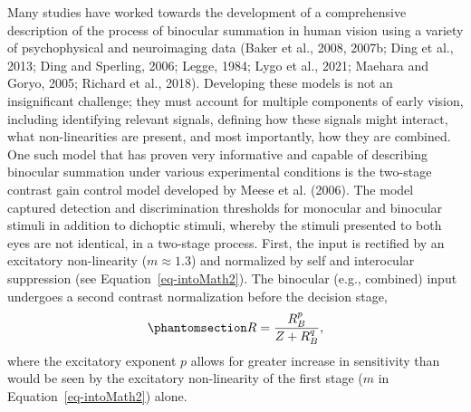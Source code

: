 \documentclass[
  12pt,
]{article}
\begin{document}
Many studies have worked towards the development of a comprehensive
description of the process of binocular summation in human vision using
a variety of psychophysical and neuroimaging data (Baker et al., 2008,
2007b; Ding et al., 2013; Ding and Sperling, 2006; Legge, 1984; Lygo et
al., 2021; Maehara and Goryo, 2005; Richard et al., 2018). Developing
these models is not an insignificant challenge; they must account for
multiple components of early vision, including identifying relevant
signals, defining how these signals might interact, what non-linearities
are present, and most importantly, how they are combined. One such model
that has proven very informative and capable of describing binocular
summation under various experimental conditions is the two-stage
contrast gain control model developed by Meese et al. (2006). The model
captured detection and discrimination thresholds for monocular and
binocular stimuli in addition to dichoptic stimuli, whereby the stimuli
presented to both eyes are not identical, in a two-stage process. First,
the input is rectified by an excitatory non-linearity
(\(m \approx 1.3\)) and normalized by self and interocular suppression
(see Equation~\ref{eq-intoMath2}). The binocular (e.g., combined) input
undergoes a second contrast normalization before the decision stage,
\begin{equation}\phantomsection\label{eq-IntroMathSecondStage}{
R = \frac{R_B^p}{Z + R_B^q},
}\end{equation} where the excitatory exponent \(p\) allows for greater
increase in sensitivity than would be seen by the excitatory
non-linearity of the first stage (\(m\) in Equation~\ref{eq-intoMath2})
alone.
\end{document}
